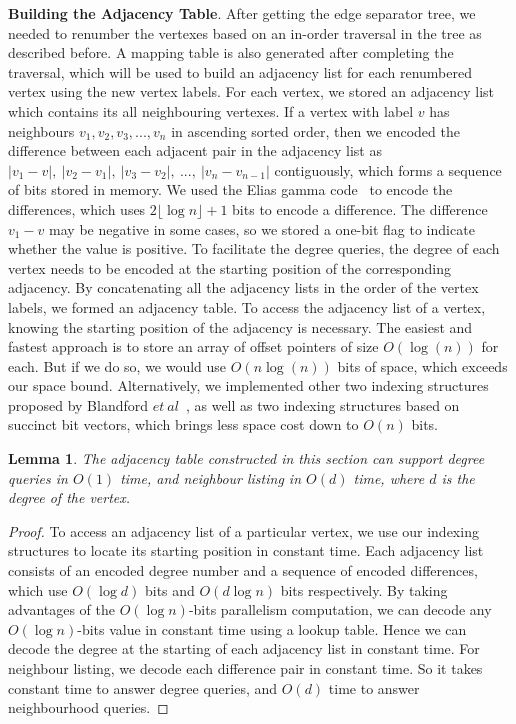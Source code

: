 \documentclass[12pt,glossary]{dalthesis}
\newtheorem{lemma}[theorem]{Lemma}
\begin{document}
\textbf{Building the Adjacency Table}. After getting the edge separator tree, we needed to renumber the vertexes based on an in-order traversal in the tree as described before. A mapping table is also generated after completing the traversal, which will be used to build an adjacency list for each renumbered vertex using the new vertex labels. For each vertex, we stored an adjacency list which contains its all neighbouring vertexes. If a vertex with label $v$ has neighbours $v_{1}, v_{2}, v_{3}, ...,v_{n}$ in ascending sorted order, then we encoded the difference between each adjacent pair in the adjacency list as $|v_{1}-v|, \ |v_{2}-v_{1}|,\  |v_{3}-v_{2}|,\ ...,\ |v_{n}-v_{n-1}|$ contiguously, which forms a sequence of bits stored in memory. We used the Elias gamma code~\cite{Gamma} to encode the differences, which uses $2\lfloor \log n \rfloor + 1$ bits to encode a difference. The difference $v_{1} - v$ may be negative in some cases, so we stored a one-bit flag to indicate whether the value is positive. To facilitate the degree queries, the degree of each vertex needs to be encoded at the starting position of the corresponding adjacency. By concatenating all the adjacency lists in the order of the vertex labels, we formed an adjacency table. To access the adjacency list of a vertex, knowing the starting position of the adjacency is necessary. The easiest and fastest approach is to store an array of offset pointers of size $O(\log (n))$ for each. But if we do so, we would use $O(n\log (n))$ bits of space, which exceeds our space bound. Alternatively, we implemented other two indexing structures proposed by Blandford $et \ al$~\cite{compact-representation}, as well as two indexing structures based on succinct bit vectors, which brings less space cost down to $O(n)$ bits.

\bigskip
\begin{lemma}
The adjacency table constructed in this section can support degree queries in $O(1)$ time, and neighbour
listing in $O(d)$ time, where $d$ is the degree of the vertex.
\end{lemma}
\bigskip 
\begin{proof}
To access an adjacency list of a particular vertex, we use our indexing structures to locate its starting position in constant time. Each adjacency list consists of an encoded degree number and a sequence of encoded differences, which use $O(\log d)$ bits and $O(d\log n)$ bits respectively. By taking advantages of the $O(\log n)$-bits parallelism computation, we can decode any $O(\log n)$-bits value in constant time using a lookup table. Hence we can decode the degree at the starting of each adjacency list in constant time. For neighbour listing, we decode each difference pair in constant time. So it takes constant time to answer degree queries, and $O(d)$ time to answer neighbourhood queries.
\end{proof}
\end{document}
